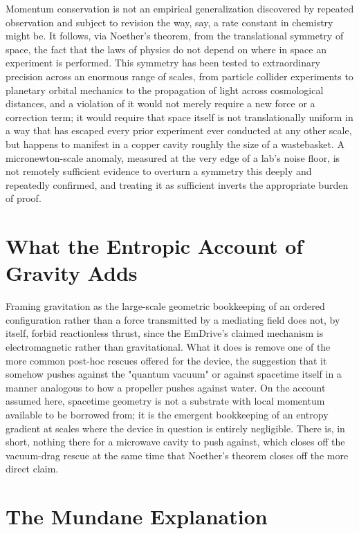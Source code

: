 \documentclass[11pt]{article}
\begin{document}
Momentum conservation is not an empirical generalization discovered by repeated observation and subject to revision the way, say, a rate constant in chemistry might be. It follows, via Noether's theorem, from the translational symmetry of space, the fact that the laws of physics do not depend on where in space an experiment is performed. This symmetry has been tested to extraordinary precision across an enormous range of scales, from particle collider experiments to planetary orbital mechanics to the propagation of light across cosmological distances, and a violation of it would not merely require a new force or a correction term; it would require that space itself is not translationally uniform in a way that has escaped every prior experiment ever conducted at any other scale, but happens to manifest in a copper cavity roughly the size of a wastebasket. A micronewton-scale anomaly, measured at the very edge of a lab's noise floor, is not remotely sufficient evidence to overturn a symmetry this deeply and repeatedly confirmed, and treating it as sufficient inverts the appropriate burden of proof.

\section{What the Entropic Account of Gravity Adds}

Framing gravitation as the large-scale geometric bookkeeping of an ordered configuration rather than a force transmitted by a mediating field does not, by itself, forbid reactionless thrust, since the EmDrive's claimed mechanism is electromagnetic rather than gravitational. What it does is remove one of the more common post-hoc rescues offered for the device, the suggestion that it somehow pushes against the "quantum vacuum" or against spacetime itself in a manner analogous to how a propeller pushes against water. On the account assumed here, spacetime geometry is not a substrate with local momentum available to be borrowed from; it is the emergent bookkeeping of an entropy gradient at scales where the device in question is entirely negligible. There is, in short, nothing there for a microwave cavity to push against, which closes off the vacuum-drag rescue at the same time that Noether's theorem closes off the more direct claim.

\section{The Mundane Explanation}
\end{document}
